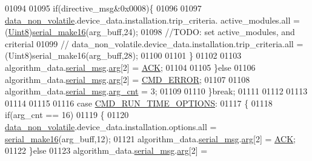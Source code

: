 \begin{DoxyCode}
{{{{{01094                           
01095                              \textcolor{keywordflow}{if}(directive\_msg&0x0008)\{
01096 
01097                                  \hyperlink{a00060_a76ac5f917f5308dcd83de0d7c94559fb}{data\_non\_volatile}.device\_data.installation.trip\_criteria.
      active\_modules.all  = (\hyperlink{a00072_af84840501dec18061d18a68c162a8fa2}{Uint8})\hyperlink{a00031_abc17de32f14103a5be219df0d4ad9176}{serial\_make16}(arg\_buff,24);
01098                                  \textcolor{comment}{//TODO: set active\_modules, and criterial }
01099                                \textcolor{comment}{// data\_non\_volatile.device\_data.installation.trip\_criteria.all             
           = (Uint8)serial\_make16(arg\_buff,28);}
01100                              
01101                              \}
01102 
01103                              algorithm\_data.\hyperlink{a00016_afcf5f557aea688aad985eec15269c1da}{serial\_msg}.\hyperlink{a00031_af7d6f762438c80072bd9dc0e4dd4ae1e}{arg}[2] = \hyperlink{a00021_a6f6489887e08bff4887d0bc5dcf214d8}{ACK};
01104                           
01105                           \}\textcolor{keywordflow}{else}
01106                              algorithm\_data.\hyperlink{a00016_afcf5f557aea688aad985eec15269c1da}{serial\_msg}.\hyperlink{a00031_af7d6f762438c80072bd9dc0e4dd4ae1e}{arg}[2] = 
      \hyperlink{a00021_a1764a522e9c1a59a59be8757c69fa494}{CMD\_ERROR};
01107 
01108                              algorithm\_data.\hyperlink{a00016_afcf5f557aea688aad985eec15269c1da}{serial\_msg}.\hyperlink{a00031_a7b79f40e2eeec288091afd340bf8f591}{arg\_cnt} = 3;
01109 
01110                 \}\textcolor{keywordflow}{break};
01111 
01112 
01113           
01114 
01115             
01116                  \textcolor{keywordflow}{case}  \hyperlink{a00021_a1d8673a7ca545f3e382fc538f543ab72}{CMD\_RUN\_TIME\_OPTIONS}:
01117                 \{
01118                          \textcolor{keywordflow}{if}(arg\_cnt == 16)
01119                          \{
01120                              \hyperlink{a00060_a76ac5f917f5308dcd83de0d7c94559fb}{data\_non\_volatile}.device\_data.installation.options.all = 
      \hyperlink{a00031_abc17de32f14103a5be219df0d4ad9176}{serial\_make16}(arg\_buff,12);
01121                              algorithm\_data.\hyperlink{a00016_afcf5f557aea688aad985eec15269c1da}{serial\_msg}.\hyperlink{a00031_af7d6f762438c80072bd9dc0e4dd4ae1e}{arg}[2] = \hyperlink{a00021_a6f6489887e08bff4887d0bc5dcf214d8}{ACK};
01122                          \}\textcolor{keywordflow}{else}
01123                              algorithm\_data.\hyperlink{a00016_afcf5f557aea688aad985eec15269c1da}{serial\_msg}.\hyperlink{a00031_af7d6f762438c80072bd9dc0e4dd4ae1e}{arg}[2] = 
}}}}}
\end{DoxyCode}
